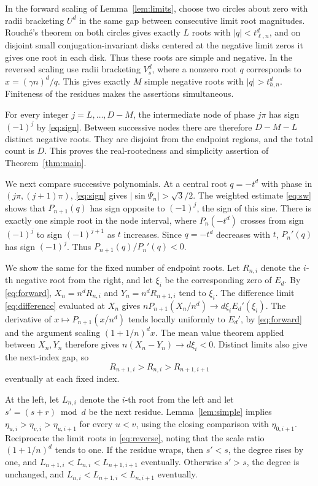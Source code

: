 \documentclass[11pt]{article}
\begin{document}
In the forward scaling of Lemma~\ref{lem:limits}, choose
two circles about zero with radii bracketing \(U^d\) in
the same gap between consecutive limit root magnitudes.
Rouch\'e's theorem on both circles gives exactly \(L\)
roots with \(|q|<t_{\ell,n}^d\), and on disjoint small
conjugation-invariant disks centered at the negative limit
zeros it gives one root in each disk. Thus these roots are
simple and negative. In the reversed scaling use radii
bracketing \(V_s^d\), where a nonzero root \(q\) corresponds
to \(x=(\gamma n)^d/q\). This gives exactly \(M\) simple
negative roots with \(|q|>t_{h,n}^d\).
Finiteness of the residues makes the assertions simultaneous.

For every integer \(j=L,\ldots,D-M\), the intermediate
node of phase \(j\pi\) has sign \((-1)^j\) by \eqref{eq:sign}.
Between successive nodes there are therefore \(D-M-L\)
distinct negative roots. They are disjoint from the endpoint
regions, and the total count is \(D\). This proves the
real-rootedness and simplicity assertion of
Theorem~\ref{thm:main}.

We next compare successive polynomials. At a central
root \(q=-t^d\) with phase in \((j\pi,(j+1)\pi)\),
\eqref{eq:sign} gives \(|\sin\Psi_n|>\sqrt3/2\).
The weighted estimate \eqref{eq:sw} shows that
\(P_{n+1}(q)\) has sign opposite to \((-1)^j\), the sign
of this sine. There is exactly one simple root in the
node interval, where \(P_n(-t^d)\) crosses from sign
\((-1)^j\) to sign \((-1)^{j+1}\) as \(t\) increases.
Since \(q=-t^d\) decreases with \(t\), \(P_n'(q)\)
has sign \((-1)^j\). Thus \(P_{n+1}(q)/P_n'(q)<0\).

We show the same for the fixed number of endpoint roots.
Let \(R_{n,i}\) denote the \(i\)-th negative root from the
right, and let \(\xi_i\) be the corresponding zero of \(E_d\).
By \eqref{eq:forward}, \(X_n=n^dR_{n,i}\) and
\(Y_n=n^dR_{n+1,i}\) tend to \(\xi_i\).
The difference limit \eqref{eq:difference} evaluated at
\(X_n\) gives
\(nP_{n+1}(X_n/n^d)\to d\xi_i E_d'(\xi_i)\).
The derivative of \(x\mapsto P_{n+1}(x/n^d)\) tends
locally uniformly to \(E_d'\), by \eqref{eq:forward}
and the argument scaling \((1+1/n)^d x\).
The mean value theorem applied between \(X_n,Y_n\)
therefore gives \(n(X_n-Y_n)\to d\xi_i<0\).
Distinct limits also give the next-index gap, so
\[
R_{n+1,i}>R_{n,i}>R_{n+1,i+1}
\]
eventually at each fixed index.

At the left, let \(L_{n,i}\) denote the \(i\)-th root
from the left and let \(s'=(s+r)\bmod d\) be the next
residue. Lemma~\ref{lem:simple} implies
\(\eta_{u,i}>\eta_{v,i}>\eta_{u,i+1}\) for every \(u<v\),
using the closing comparison with \(\eta_{0,i+1}\).
Reciprocate the limit roots in \eqref{eq:reverse},
noting that the scale ratio \((1+1/n)^d\) tends to one.
If the residue wraps, then \(s'<s\), the degree rises by
one, and \(L_{n+1,i}<L_{n,i}<L_{n+1,i+1}\) eventually.
Otherwise \(s'>s\), the degree is unchanged, and
\(L_{n,i}<L_{n+1,i}<L_{n,i+1}\) eventually.
\end{document}
